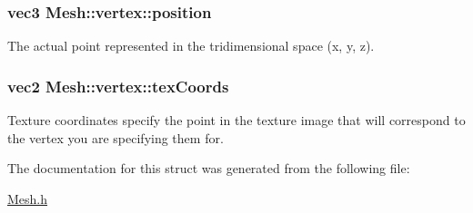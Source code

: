 \subsubsection[{\texorpdfstring{position}{position}}]{\setlength{\rightskip}{0pt plus 5cm}vec3 Mesh\+::vertex\+::position}\hypertarget{structMesh_1_1vertex_a2c2b574a9ecd906c361da07eaf124c5d}{}\label{structMesh_1_1vertex_a2c2b574a9ecd906c361da07eaf124c5d}
The actual point represented in the tridimensional space (x, y, z). 
\subsubsection[{\texorpdfstring{tex\+Coords}{texCoords}}]{\setlength{\rightskip}{0pt plus 5cm}vec2 Mesh\+::vertex\+::tex\+Coords}\hypertarget{structMesh_1_1vertex_a62bc25534c13023dc785c8a45d8432c6}{}\label{structMesh_1_1vertex_a62bc25534c13023dc785c8a45d8432c6}
Texture coordinates specify the point in the texture image that will correspond to the vertex you are specifying them for. 

The documentation for this struct was generated from the following file\+:\begin{DoxyCompactItemize}
\item 
\hyperlink{Mesh_8h}{Mesh.\+h}\end{DoxyCompactItemize}
